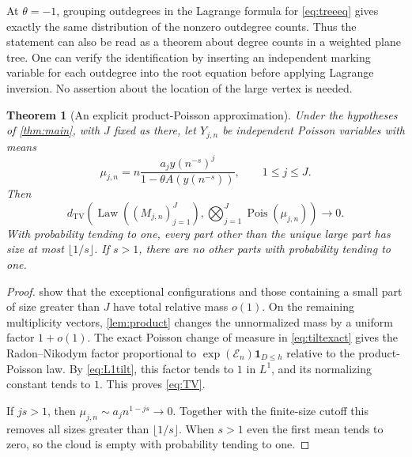 \documentclass[11pt,a4paper]{article}
\newtheorem{theorem}{Theorem}[section]
\theoremstyle{definition}
\theoremstyle{remark}
\newcommand{\TV}{d_{\mathrm{TV}}}
\newcommand{\ind}{\mathbf 1}
\DeclareMathOperator{\Pois}{Pois}
\DeclareMathOperator{\Law}{Law}
\numberwithin{equation}{section}
\begin{document}
At $\theta=-1$, grouping outdegrees in the Lagrange formula for
\eqref{eq:treeeq} gives exactly the same distribution of the nonzero
outdegree counts. Thus the statement can also be read as a theorem
about degree counts in a weighted plane tree. One can verify the identification by inserting an independent marking
variable for each outdegree into the root equation before applying
Lagrange inversion. No assertion about the location of the large vertex
is needed.

\begin{theorem}[An explicit product-Poisson approximation]
\label{thm:Poissonlaw}
Under the hypotheses of \cref{thm:main}, with $J$ fixed as there,
let $Y_{j,n}$ be independent Poisson variables with means
\begin{equation}
 \mu_{j,n}=n\frac{a_jy(n^{-s})^j}{1-\theta A(y(n^{-s}))},
 \qquad1\le j\le J.
 \label{eq:explicitcenters}
\end{equation}
Then
\begin{equation}
 \TV\left(\Law((M_{j,n})_{j=1}^J),
                \bigotimes_{j=1}^J\Pois(\mu_{j,n})\right)\to0.
 \label{eq:TV}
\end{equation}
With probability tending to one, every part other than the unique
large part has size at most $\lfloor1/s\rfloor$. If $s>1$, there are
no other parts with probability tending to one.
\end{theorem}
\begin{proof}
 show that the exceptional
configurations and those containing a small part of size greater than
$J$ have total relative mass $o(1)$.
On the remaining multiplicity vectors, \cref{lem:product} changes the
unnormalized mass by a uniform factor $1+o(1)$.
The exact Poisson change of measure in \eqref{eq:tiltexact} gives the
Radon--Nikodym factor proportional to
$\exp(\mathcal E_n)\ind_{D\le h}$ relative to the product-Poisson law.
By \eqref{eq:L1tilt}, this factor tends to $1$ in $L^1$, and its
normalizing constant tends to $1$. This proves \eqref{eq:TV}.

If $js>1$, then $\mu_{j,n}\sim a_jn^{1-js}\to0$.
Together with the finite-size cutoff this removes all sizes greater
than $\lfloor1/s\rfloor$. When $s>1$ even the first mean tends to
zero, so the cloud is empty with probability tending to one.
\end{proof}
\end{document}
